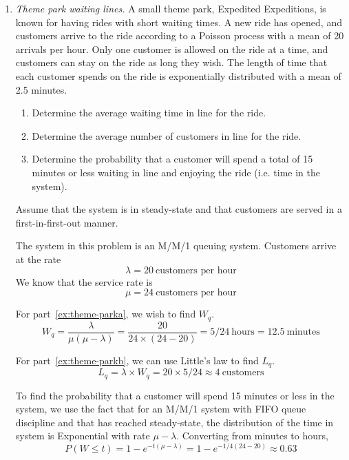 \begin{enumerate}
\item \emph{Theme park waiting lines.} A small theme park, Expedited
  Expeditions, is known for having rides with short waiting times. A
  new ride has opened, and customers arrive to the ride according to a
  Poisson process with a mean of 20 arrivals per hour. Only one
  customer is allowed on the ride at a time, and customers can stay on
  the ride as long they wish. The length of time that each customer
  spends on the ride is exponentially distributed with a mean of 2.5
  minutes.
\begin{enumerate}
\item Determine the average waiting time in line for the ride. \label{ex:theme-parka}
\item Determine the average number of customers in line for the
  ride. \label{ex:theme-parkb}
\item Determine the probability that a customer will spend a total of
15 minutes or less waiting in line and enjoying the ride
(i.e. time in the system). \label{ex:theme-parkc}
\end{enumerate}
Assume that the system is in steady-state and that customers are
served in a first-in-first-out manner.

\begin{solution}
  \bs The system in this problem is an M/M/1 queuing system. Customers
  arrive at the rate
\[ \lambda = 20~\text{customers per hour} \]
We know that the service rate is 
\[ \mu = 24~\text{customers per hour} \]

For part~\ref{ex:theme-parka}, we wish to find $W_q$. 
\[ W_q = \frac{\lambda}{\mu(\mu-\lambda)} = \frac{20}{24
    \times(24-20)} = 5/24~\text{hours} = 12.5~\text{minutes} \]

For part~\ref{ex:theme-parkb}, we can use Little's law to find $L_q$. 
\[ L_q = \lambda \times W_q  = 20 \times 5/24 \approx 4~\text{customers}\]

To find the probability that a customer will spend 15 minutes or less
in the system, we use the fact that for an M/M/1 system with FIFO
queue discipline and that has reached steady-state, the distribution
of the time in system is Exponential with rate $\mu-\lambda$.
Converting from minutes to hours,
\[ P(W \leq t) = 1 - e^{-t(\mu-\lambda)}= 1 - e^{-1/4(24-20)} \approx 0.63\]
\end{solution}


\end{enumerate}
